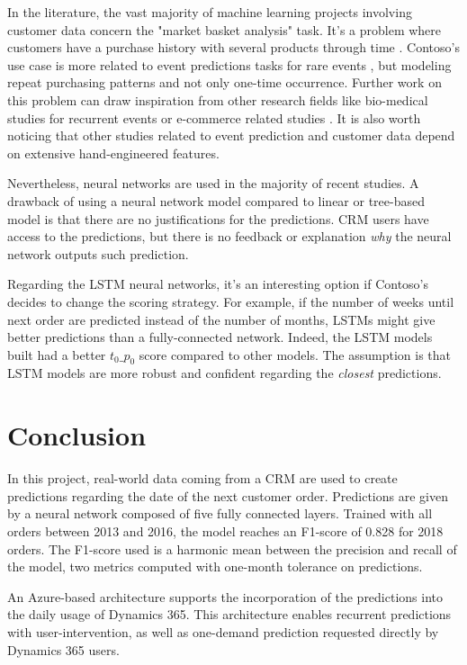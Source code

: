 In the literature, the vast majority of machine learning projects involving customer data concern the "market basket analysis" task. It's a problem where customers have a purchase history with several products through time \cite{temporal-feature}. Contoso's use case is more related to event predictions tasks for rare events \cite{7953302, Malhotra2015LongST}, but modeling repeat purchasing patterns and not only one-time occurrence. Further work on this problem can draw inspiration from other research fields like bio-medical studies for recurrent events \cite{biomedical-recurrent-events} or e-commerce related studies \cite{Liu:2016-repeat-buyer, Tian2015}. It is also worth noticing that other studies related to event prediction and customer data depend on extensive hand-engineered features.

Nevertheless, neural networks are used in the majority of recent studies. A drawback of using a neural network model compared to linear or tree-based model is that there are no justifications for the predictions. CRM users have access to the predictions, but there is no feedback or explanation \textit{why} the neural network outputs such prediction.

Regarding the LSTM neural networks, it's an interesting option if Contoso's decides to change the scoring strategy. For example, if the number of weeks until next order are predicted instead of the number of months, LSTMs might give better predictions than a fully-connected network. Indeed, the LSTM models built had a better $t_0\_p_0$ score compared to other models. The assumption is that LSTM models are more robust and confident regarding the \textit{closest} predictions.

\section{Conclusion} \label{sec:use-case-conclusion}
In this project, real-world data coming from a CRM are used to create predictions regarding the date of the next customer order. Predictions are given by a neural network composed of five fully connected layers. Trained with all orders between 2013 and 2016, the model reaches an F1-score of 0.828 for 2018 orders. The F1-score used is a harmonic mean between the precision and recall of the model, two metrics computed with one-month tolerance on predictions.

An Azure-based architecture supports the incorporation of the predictions into the daily usage of Dynamics 365. This architecture enables recurrent predictions with user-intervention, as well as one-demand prediction requested directly by Dynamics 365 users.
